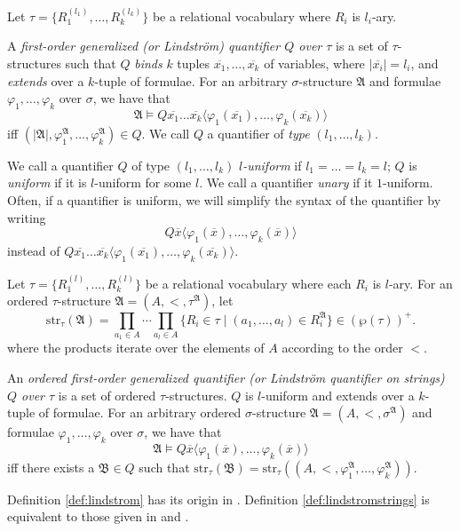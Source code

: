 \documentclass[a4paper,UKenglish,cleveref, autoref, thm-restate, anonymous]{lipics-v2021}
\begin{document}
\begin{definition}\label{def:lindstrom}
    Let $\tau = \{R_1^{(l_1)}, \dots, R_k^{(l_k)}\}$ be a relational vocabulary where $R_i$ is $l_i$-ary. 
    
    A \emph{first-order generalized (or Lindstr{\"o}m) quantifier $Q$ over $\tau$} is a set of $\tau$-structures such that $Q$ \emph{binds} $k$ tuples $\overline{x_1},\dots,\overline{x_k}$ of variables, where $|\overline{x_i}| = l_i$, and \emph{extends} over a $k$-tuple of formulae. For an arbitrary $\sigma$-structure $\mathfrak{A}$ and formulae $\varphi_1, \dots, \varphi_k$ over $\sigma$, we have that \[
        \mathfrak{A} \models Q\overline{x_1}\dots\overline{x_k}\langle \varphi_1(\overline{x_1}), \dots, \varphi_k(\overline{x_k})\rangle
    \] iff $(|\mathfrak{A}|, \varphi_1^\mathfrak{A}, \dots, \varphi_k^\mathfrak{A}) \in Q$. We call $Q$ a quantifier of \emph{type} $(l_1, \dots, l_k)$.

    We call a quantifier $Q$ of type $(l_1, \dots, l_k)$ \emph{$l$-uniform} if $l_1 = \dots = l_k = l$; $Q$ is \emph{uniform} if it is $l$-uniform for some $l$. We call a quantifier \emph{unary} if it $1$-uniform. Often, if a quantifier is uniform, we will simplify the syntax of the quantifier by writing \[Q\overline{x}\langle \varphi_1(\overline{x}), \dots, \varphi_k(\overline{x})\rangle\] instead of $Q\overline{x_1}\dots\overline{x_k}\langle \varphi_1(\overline{x_1}), \dots, \varphi_k(\overline{x_k})\rangle$.
    
\end{definition}

\begin{definition}\label{def:lindstromstrings}
    Let $\tau = \{R_1^{(l)}, \dots, R_k^{(l)}\}$ be a relational vocabulary where each $R_i$ is $l$-ary. For an ordered $\tau$-structure $\mathfrak{A} = (A, <, \tau^\mathfrak{A})$, let \[
        \text{str}_\tau(\mathfrak{A}) = \prod_{a_1 \in A}\cdots\prod_{a_l \in A}\{ R_i \in \tau \mid (a_1, \dots, a_l) \in R_i^\mathfrak{A} \} \in (\wp(\tau))^{+}.
    \] where the products iterate over the elements of $A$ according to the order $<$.

    An \emph{ordered first-order generalized quantifier (or Lindstr{\"o}m quantifier on strings) $Q$ over $\tau$} is a set of ordered $\tau$-structures. $Q$ is $l$-uniform and extends over a $k$-tuple of formulae. For an arbitrary ordered $\sigma$-structure $\mathfrak{A} = (A, <, \sigma^{\mathfrak{A}})$ and formulae $\varphi_1, \dots, \varphi_k$ over $\sigma$, we have that \[
        \mathfrak{A} \models Q\overline{x}\langle \varphi_1(\overline{x}), \dots, \varphi_k(\overline{x})\rangle
    \] iff there exists a $\mathfrak{B} \in Q$ such that \(
        \text{str}_\tau(\mathfrak{B}) = \text{str}_\tau((A, <, \varphi_1^\mathfrak{A}, \dots, \varphi_k^\mathfrak{A})).
    \)
\end{definition}
\begin{remark}
    Definition \ref{def:lindstrom} has its origin in \cite{lindstrom1966first}. Definition \ref{def:lindstromstrings} is equivalent to those given in \cite{burtschick1998lindstrom} and \cite{lautemann2001descriptive}. 
\end{remark}
\fi
\end{document}
